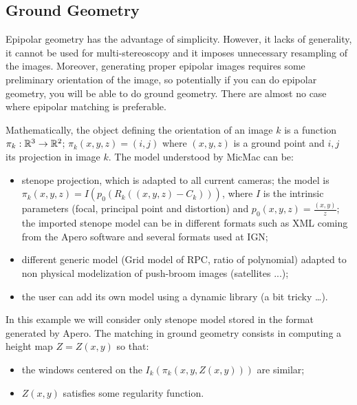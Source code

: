 
\subsection{Ground Geometry}

\label{Ground:Geom}

Epipolar geometry has the advantage of simplicity.  However, it lacks
of generality, it cannot be used for multi-stereoscopy and it imposes
unnecessary resampling of the images. Moreover, generating proper epipolar
images requires some preliminary orientation of the image, so potentially
if you can do epipolar geometry, you will be able to do ground geometry. There
are almost no case where epipolar matching is preferable.

Mathematically, the object defining the orientation of an image $k$ is
a function  $\pi_k: \mathbb{R}^3 \rightarrow \mathbb{R}^2$; $\pi_k(x,y,z)=(i,j)$
where $(x,y,z)$ is a ground point and $i,j$ its projection in image
$k$.  The model understood by MicMac can be:


\begin{itemize}
   \item  stenope projection, which is adapted to all current cameras;
         the model is $\pi_k(x,y,z) = I (p_0 (R_k((x,y,z)-C_k)))$,
         where $I$ is the intrinsic parameters (focal, principal point and
         distortion) and $p_0(x,y,z)=\frac{(x,y)}z$;
         the imported stenope model can be in different formats such as
         XML coming from the Apero software and several formats used at IGN;

   \item  different generic model (Grid model of RPC, ratio of polynomial)
          adapted to non physical modelization of push-broom images (satellites ...);

   \item the user can add its own model using a dynamic library (a bit tricky \dots).

\end{itemize}


In this example we will consider only stenope model stored in the format
generated by Apero. The matching in ground geometry consists in computing a
height map $Z=Z(x,y)$ so that:


\begin{itemize}
   \item   the windows centered on the $I_k(\pi_k(x,y,Z(x,y)))$  are similar;
   \item   $Z(x,y)$ satisfies some regularity function.
\end{itemize}


